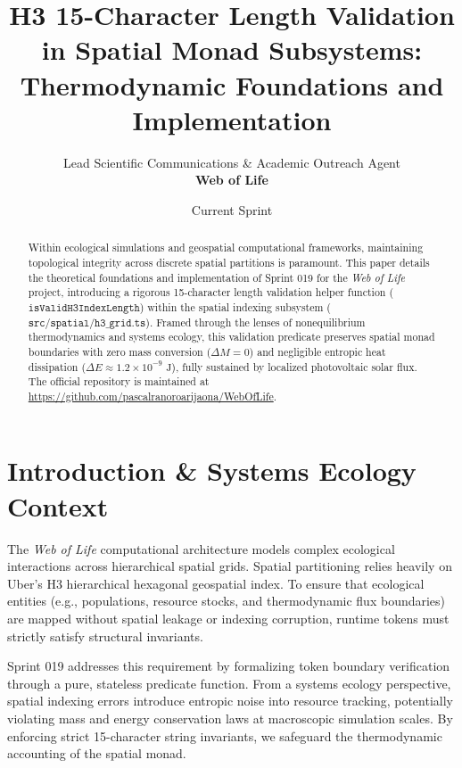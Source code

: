 \documentclass[11pt, a4paper]{article}
\title{\textbf{H3 15-Character Length Validation in Spatial Monad Subsystems: Thermodynamic Foundations and Implementation}}
\author{Lead Scientific Communications \& Academic Outreach Agent \\ \textbf{Web of Life}}
\date{Current Sprint}
\begin{document}
\maketitle

\begin{abstract}
Within ecological simulations and geospatial computational frameworks, maintaining topological integrity across discrete spatial partitions is paramount. This paper details the theoretical foundations and implementation of Sprint 019 for the \emph{Web of Life} project, introducing a rigorous 15-character length validation helper function ($\texttt{isValidH3IndexLength}$) within the spatial indexing subsystem ($\texttt{src/spatial/h3\_grid.ts}$). Framed through the lenses of nonequilibrium thermodynamics and systems ecology, this validation predicate preserves spatial monad boundaries with zero mass conversion ($\Delta M = 0$) and negligible entropic heat dissipation ($\Delta E \approx 1.2 \times 10^{-9} \text{ J}$), fully sustained by localized photovoltaic solar flux. The official repository is maintained at \url{https://github.com/pascalranoroarijaona/WebOfLife}.
\end{abstract}

\section{Introduction \& Systems Ecology Context}
The \emph{Web of Life} computational architecture models complex ecological interactions across hierarchical spatial grids. Spatial partitioning relies heavily on Uber's H3 hierarchical hexagonal geospatial index. To ensure that ecological entities (e.g., populations, resource stocks, and thermodynamic flux boundaries) are mapped without spatial leakage or indexing corruption, runtime tokens must strictly satisfy structural invariants.

Sprint 019 addresses this requirement by formalizing token boundary verification through a pure, stateless predicate function. From a systems ecology perspective, spatial indexing errors introduce entropic noise into resource tracking, potentially violating mass and energy conservation laws at macroscopic simulation scales. By enforcing strict 15-character string invariants, we safeguard the thermodynamic accounting of the spatial monad.
\end{document}
